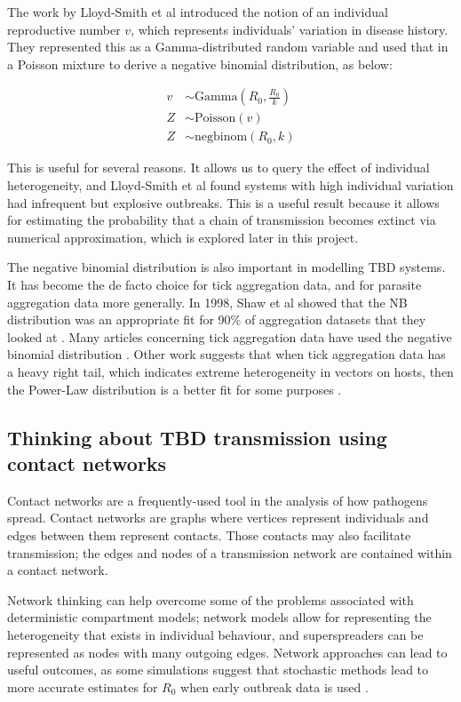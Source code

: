 \documentclass{article}
\begin{document}
The work by Lloyd-Smith et al introduced the notion of an individual reproductive number $ v $, which represents individuals' variation in disease history. They represented this as a Gamma-distributed random variable and used that in a Poisson mixture to derive a negative binomial distribution, as below:

\begin{align}\label{PoissonMixture}
	v &\sim \text{Gamma}\left(R_0, \frac{R_0}{k}\right) \nonumber \\
	Z &\sim \text{Poisson}(v) \\
	Z &\sim \text{negbinom}(R_0, k) \nonumber
\end{align}

This is useful for several reasons. It allows us to query the effect of individual heterogeneity, and Lloyd-Smith et al found systems with high individual variation had infrequent but explosive outbreaks. This is a useful result because it allows for estimating the probability that a chain of transmission becomes extinct via numerical approximation, which is explored later in this project.

The negative binomial distribution is also important in modelling TBD systems. It has become the de facto choice for tick aggregation data, and for parasite aggregation data more generally. In 1998, Shaw et al showed that the NB distribution was an appropriate fit for 90\% of aggregation datasets that they looked at \cite{SHAW1998}. Many articles concerning tick aggregation data have used the negative binomial distribution \cite{Bown2003, HARRISON2012, Brunner2008}. Other work suggests that when tick aggregation data has a heavy right tail, which indicates extreme heterogeneity in vectors on hosts, then the Power-Law distribution is a better fit for some purposes \cite{Ferreri2014, Bisanzio2010}.

\subsection{Thinking about TBD transmission using contact networks}

Contact networks are a frequently-used tool in the analysis of how pathogens spread. Contact networks are graphs where vertices represent individuals and edges between them represent contacts. Those contacts may also facilitate transmission; the edges and nodes of a transmission network are contained within a contact network. 

Network thinking can help overcome some of the problems associated with deterministic compartment models; network models allow for representing the heterogeneity that exists in individual behaviour, and superspreaders can be represented as nodes with many outgoing edges. Network approaches can lead to useful outcomes, as some simulations suggest that stochastic methods lead to more accurate estimates for $ R_0 $ when early outbreak data is used \cite{Brauer2008b}.
\end{document}
